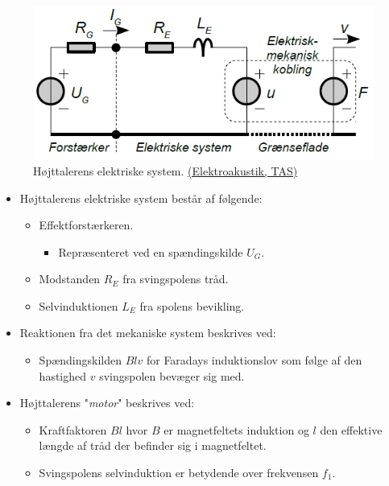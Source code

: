 \begin{figure} [H]
	\centering
	\includegraphics[width=0.8\linewidth]{graphics/23.png}
	\caption{Højttalerens elektriske system. \href{http://www.torean.dk/artikel/Elektroakustik.pdf}{(Elektroakustik, TAS)}}
	\label{fig:23}
\end{figure}
\begin{itemize}
	\item Højttalerens elektriske system består af følgende:
	\begin{itemize}
		\item Effektforstærkeren.
		\begin{itemize}
			\item Repræsenteret ved en spændingskilde $U_G$.
		\end{itemize}
		\item Modstanden $R_E$ fra svingspolens tråd.
		\item Selvinduktionen $L_E$ fra spolens	bevikling.
	\end{itemize} 
	\item Reaktionen fra det mekaniske system beskrives ved:
	\begin{itemize}
		\item Spændingskilden $Blv$ for Faradays induktionslov som følge af den hastighed $v$ svingspolen bevæger sig med.
	\end{itemize}
	\item Højttalerens "\textit{motor}" beskrives ved:	
	\begin{itemize}
		\item Kraftfaktoren $Bl$ hvor $B$ er magnetfeltets induktion og $l$ den effektive længde af tråd der befinder sig i magnetfeltet.
		\item Svingspolens selvinduktion er betydende over frekvensen $f_1$.
	\end{itemize}
\end{itemize}
    
